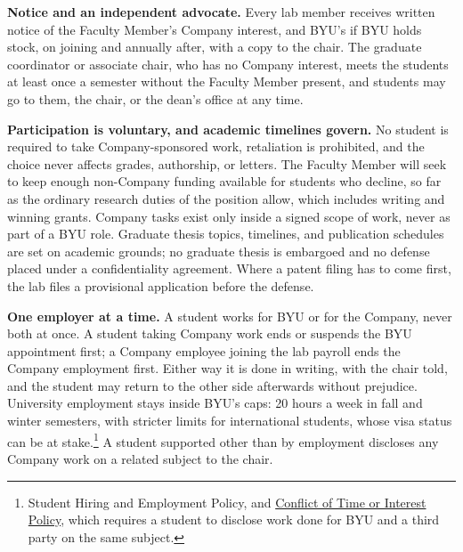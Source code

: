 \documentclass[11pt]{article}
\begin{document}

 \textbf{Notice and an independent advocate.} Every lab member
receives written notice of the Faculty Member's Company interest, and BYU's if
BYU holds stock, on joining and annually after, with a copy to the chair. The
graduate coordinator or associate chair, who has no Company interest, meets
the students at least once a semester without the Faculty Member present, and
students may go to them, the chair, or the dean's office at any time.

 \textbf{Participation is voluntary, and academic timelines
govern.} No student is required to take Company-sponsored work, retaliation is
prohibited, and the choice never affects grades, authorship, or letters. The
Faculty Member will seek to keep enough non-Company funding available for
students who decline, so far as the ordinary research duties of the position
allow, which includes writing and winning grants. Company tasks exist only
inside a signed scope of work, never as part of a BYU role. Graduate thesis
topics, timelines, and publication schedules are set on academic grounds; no
graduate thesis is embargoed and no defense placed under a confidentiality
agreement. Where a patent filing has to come first, the lab files a provisional
application before the defense.

 \textbf{One employer at a time.} A student works for BYU or for
the Company, never both at once. A student taking Company work ends or suspends
the BYU appointment first; a Company employee joining the lab payroll ends the
Company employment first. Either way it is done in writing, with the chair
told, and the student may return to the other side afterwards without
prejudice. University employment stays inside BYU's caps: 20 hours a week in
fall and winter semesters, with stricter limits for international students,
whose visa status can be at stake.\footnote{Student Hiring and Employment
Policy, and
\href{https://policy.byu.edu/view/conflict-of-time-or-interest-policy}{Conflict
of Time or Interest Policy}, which requires a student to disclose work done for
BYU and a third party on the same subject.} A student supported other than by
employment discloses any Company work on a related subject to the chair.
\end{document}
